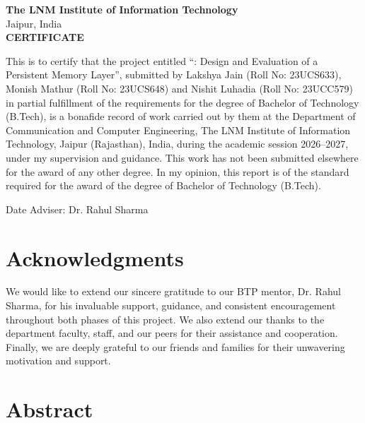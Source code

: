 \thispagestyle{empty}
\begin{center}
{\large\bfseries The LNM Institute of Information Technology}\\
Jaipur, India\\[0.5in]
{\large\bfseries CERTIFICATE}
\end{center}
\vspace{0.2in}
This is to certify that the project entitled ``\shorttitle: Design and Evaluation of a Persistent Memory Layer'',
submitted by Lakshya Jain (Roll No: 23UCS633), Monish Mathur (Roll No: 23UCS648) and Nishit Luhadia
(Roll No: 23UCC579) in partial fulfillment of the requirements for the degree of Bachelor of Technology
(B.Tech), is a bonafide record of work carried out by them at the Department of Communication and Computer
Engineering, The LNM Institute of Information Technology, Jaipur (Rajasthan), India, during the academic
session 2026--2027, under my supervision and guidance. This work has not been submitted elsewhere for the
award of any other degree. In my opinion, this report is of the standard required for the award of the
degree of Bachelor of Technology (B.Tech).
\vspace{0.8in}

\noindent Date \hfill Adviser: Dr. Rahul Sharma
\clearpage

\chapter*{Acknowledgments}
We would like to extend our sincere gratitude to our BTP mentor, Dr. Rahul Sharma, for his invaluable
support, guidance, and consistent encouragement throughout both phases of this project. We also extend our
thanks to the department faculty, staff, and our peers for their assistance and cooperation. Finally, we are
deeply grateful to our friends and families for their unwavering motivation and support.
\clearpage

\chapter*{Abstract}

\clearpage

